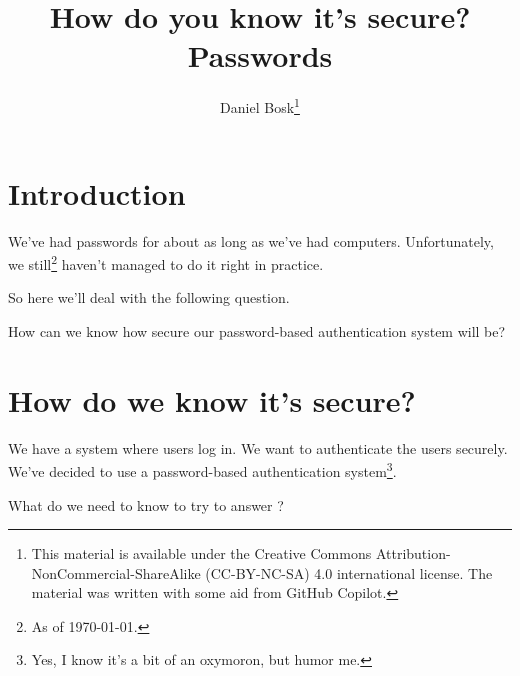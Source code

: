 \title{%
  How do you know it's secure?
  Passwords
}
\author{Daniel Bosk\thanks{%
    This material is available under the Creative Commons 
    Attribution-NonCommercial-ShareAlike (CC-BY-NC-SA) 4.0 international 
    license.
    The material was written with some aid from GitHub Copilot.
}}

\begin{frame}
  \maketitle
\end{frame}

\mode*

\begin{abstract}
  
\end{abstract}

\clearpage

\section{Introduction}

\begin{frame}
We've had passwords for about as long as we've had computers.
Unfortunately, we still\footnote{As of \today.} haven't managed to do it right 
in practice.
\end{frame}
So here we'll deal with the following question.

\begin{frame}
  \begin{question}\label{RQ}
    How can we know how secure our password-based authentication system will be?
  \end{question}
\end{frame}


\section{How do we know it's secure?}

\begin{frame}
We have a system where users log in.
We want to authenticate the users securely.
We've decided to use a password-based authentication system\footnote{%
  Yes, I know it's a bit of an oxymoron, but humor me.
}.
\end{frame}

\begin{frame}
  \begin{exercise}
    What do we need to know to try to answer ?
  \end{exercise}
\end{frame}


